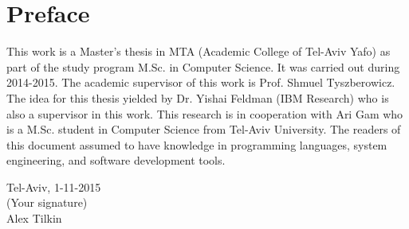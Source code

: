 \section*{Preface}
This work is a Master's thesis in MTA (Academic College of Tel-Aviv Yafo) as part of the study program M.Sc. in Computer Science. It was carried out during 2014-2015. The academic supervisor of this work is Prof. Shmuel Tyszberowicz. The idea for this thesis yielded by Dr. Yishai Feldman (IBM Research) who is also a supervisor in this work. This research is in cooperation with Ari Gam who is a M.Sc. student in Computer Science from Tel-Aviv University. The readers of this document assumed to have knowledge in programming languages, system engineering, and software development tools.\\[2cm]

\begin{center}
Tel-Aviv, 1-11-2015\\[1pc]
(Your signature)\\[1pc]
Alex Tilkin
\end{center}